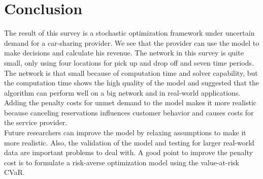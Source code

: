 \section{Conclusion}

The result of this survey is a stochastic optimization framework under uncertain demand for a car-sharing provider. We see that the provider can use the model to make decisions and calculate his revenue. The network in this survey is quite small, only using four locations for pick up and drop off and seven time periods. The network is that small because of computation time and solver capability, but the computation time shows the high quality of the model and suggested that the algorithm can perform well on a big network and in real-world applications. Adding the penalty costs for unmet demand to the model makes it more realistic because canceling reservations influences customer behavior and causes costs for the service provider.\\
Future researchers can improve the model by relaxing assumptions to make it more realistic. Also, the validation of the model and testing for larger real-world data are important problems to deal with. A good point to improve the penalty cost is to formulate a risk-averse optimization model using the value-at-risk CVaR.